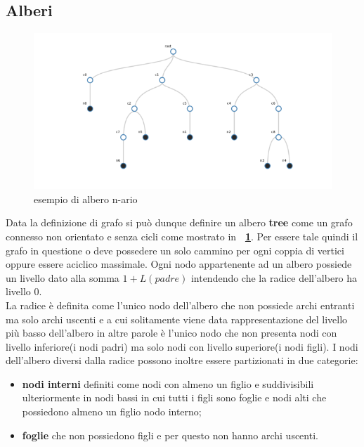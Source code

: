 {\subsection{Alberi}
\begin{figure}[!htb]
	\begin{center}
		\includegraphics[width=0.8 \linewidth]{figure/alberoGenerico}
	\end{center}
	\caption{esempio di albero n-ario \label{fig:alberoGenerico}}
\end{figure}
Data la definizione di grafo si può dunque definire un albero \textbf{tree} come un grafo connesso non orientato e senza cicli come mostrato in \textbf{\figurename~\ref{fig:alberoGenerico}}. Per essere tale quindi il grafo in questione o deve possedere un solo cammino per ogni coppia di vertici oppure essere aciclico massimale.
Ogni nodo appartenente ad un albero possiede un livello dato alla somma $ 1 + L(padre) $ intendendo che la radice dell'albero ha livello 0.\\
La radice è definita come l'unico nodo dell'albero che non possiede archi entranti ma solo archi uscenti e a cui solitamente viene data rappresentazione del livello più basso dell'albero in altre parole è l'unico nodo che non presenta nodi con livello inferiore(i nodi padri) ma solo nodi con livello superiore(i nodi figli). 
I nodi dell'albero diversi dalla radice possono inoltre essere partizionati in due categorie:\\
\begin{itemize}
	\item\textbf{nodi interni} definiti come nodi con almeno un figlio e suddivisibili ulteriormente in nodi bassi in cui tutti i figli sono foglie e nodi alti che possiedono almeno un figlio nodo interno;
	\item\textbf{foglie }che non possiedono figli e per questo non hanno archi uscenti.
\end{itemize}

}
